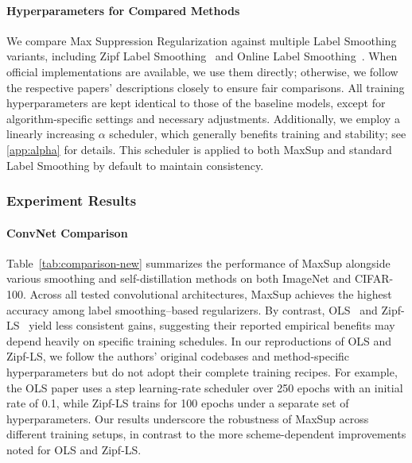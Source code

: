 \paragraph{Hyperparameters for Compared Methods}  
We compare Max Suppression Regularization against multiple Label Smoothing variants, including Zipf Label Smoothing~\citep{liang2022efficient} and Online Label Smoothing~\citep{zhang2021delving}. When official implementations are available, we use them directly; otherwise, we follow the respective papers’ descriptions closely to ensure fair comparisons. All training hyperparameters are kept identical to those of the baseline models, except for algorithm-specific settings and necessary adjustments. Additionally, we employ a linearly increasing \(\alpha\) scheduler, which generally benefits training and stability; see \cref{app:alpha} for details. This scheduler is applied to both MaxSup and standard Label Smoothing by default to maintain consistency.


\subsubsection{Experiment Results}
\label{sec:classification}

\paragraph{ConvNet Comparison}
Table~\ref{tab:comparison-new} summarizes the performance of MaxSup alongside various smoothing and self-distillation methods on both ImageNet and CIFAR-100. Across all tested convolutional architectures, MaxSup achieves the highest accuracy among label smoothing–based regularizers. By contrast, OLS~\citep{zhang2021delving} and Zipf-LS~\citep{liang2022efficient} yield less consistent gains, suggesting their reported empirical benefits may depend heavily on specific training schedules.
In our reproductions of OLS and Zipf-LS, we follow the authors’ original codebases and method-specific hyperparameters but do not adopt their complete training recipes. For example, the OLS paper uses a step learning-rate scheduler over 250 epochs with an initial rate of 0.1, while Zipf-LS trains for 100 epochs under a separate set of hyperparameters. Our results underscore the robustness of MaxSup across different training setups, in contrast to the more scheme-dependent improvements noted for OLS and Zipf-LS.

